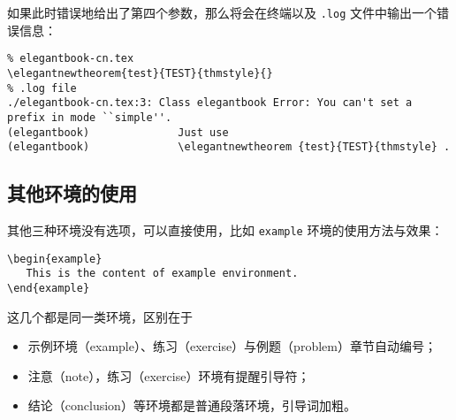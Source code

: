 \documentclass[lang=cn,newtx,10pt,scheme=chinese,color=black]{elegantbook}
\begin{document}
\begin{itemize}
  如果此时错误地给出了第四个参数，那么将会在终端以及 \verb|.log| 文件中输出一个错误信息：
\begin{lstlisting}
% elegantbook-cn.tex
\elegantnewtheorem{test}{TEST}{thmstyle}{}
% .log file
./elegantbook-cn.tex:3: Class elegantbook Error: You can't set a prefix in mode ``simple''.
(elegantbook)              Just use 
(elegantbook)              \elegantnewtheorem {test}{TEST}{thmstyle} .
\end{lstlisting}

\end{itemize}

\subsection{其他环境的使用}

其他三种环境没有选项，可以直接使用，比如 \lstinline{example} 环境的使用方法与效果：
\begin{lstlisting}
\begin{example}
   This is the content of example environment.
\end{example}
\end{lstlisting}

这几个都是同一类环境，区别在于

\begin{itemize}
  \item 示例环境（example）、练习（exercise）与例题（problem）章节自动编号；
  \item 注意（note），练习（exercise）环境有提醒引导符；
  \item 结论（conclusion）等环境都是普通段落环境，引导词加粗。
\end{itemize}
\end{document}
